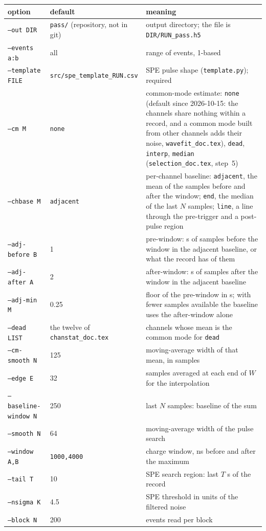 \documentclass[11pt]{article}
\newcommand{\code}[1]{\texttt{#1}}
\newcommand{\us}{\textmu s}
\begin{document}
\begin{center}
\begin{tabular}{l l p{70mm}}
\toprule
option & default & meaning \\
\midrule
\code{--out DIR} & \code{pass/} (repository, not in git) & output directory; the file is \code{DIR/RUN\_pass.h5} \\
\code{--events a:b} & all & range of events, 1-based \\
\code{--template FILE} & \code{src/spe\_template\_RUN.csv} & SPE pulse shape (\code{template.py}); required \\
\code{--cm M} & \code{none} & common-mode estimate: \code{none} (default since 2026-10-15: the channels share nothing within a record, and a common mode built from other channels adds their noise, \code{wavefit\_doc.tex}), \code{dead}, \code{interp}, \code{median} (\code{selection\_doc.tex}, step~5) \\
\code{--chbase M} & \code{adjacent} & per-channel baseline: \code{adjacent}, the mean of the samples before and after the window; \code{end}, the median of the last $N$ samples; \code{line}, a line through the pre-trigger and a post-pulse region \\
\code{--adj-before B} & 1 & pre-window: \us{} of samples before the window in the adjacent baseline, or what the record has of them \\
\code{--adj-after A} & 2 & after-window: \us{} of samples after the window in the adjacent baseline \\
\code{--adj-min M} & 0.25 & floor of the pre-window in \us{}; with fewer samples available the baseline uses the after-window alone \\
\code{--dead LIST} & the twelve of \code{chanstat\_doc.tex} & channels whose mean is the common mode for \code{dead} \\
\code{--cm-smooth N} & 125 & moving-average width of that mean, in samples \\
\code{--edge E} & 32 & samples averaged at each end of $W$ for the interpolation \\
\code{--baseline-window N} & 250 & last $N$ samples: baseline of the sum \\
\code{--smooth N} & 64 & moving-average width of the pulse search \\
\code{--window A,B} & \code{1000,4000} & charge window, ns before and after the maximum \\
\code{--tail T} & 10 & SPE search region: last $T$ \us{} of the record \\
\code{--nsigma K} & 4.5 & SPE threshold in units of the filtered noise \\
\code{--block N} & 200 & events read per block \\
\bottomrule
\end{tabular}
\end{center}
\end{document}
